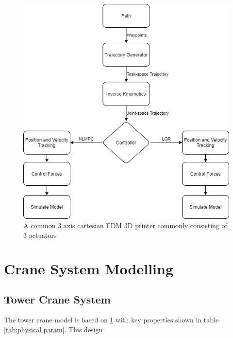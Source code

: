 \documentclass{UoNMCHA}
\numberwithin{equation}{section}
\begin{document}
	\begin{figure}[H]
		\begin{center}
			\includegraphics[width=.8\linewidth]{figs/Picture4}
			\caption{A  common 3 axis cartesian FDM 3D printer commonly consisting of 3 actuators}
			\label{figs/Picture4}
		\end{center}
	\end{figure}
	
	\section{Crane System Modelling}
	
	\subsection{Tower Crane System}
	The tower crane model is based on \ref{figs/Picture4} with key properties shown in table \ref{tab:physical param}. This design
	
\end{document}
